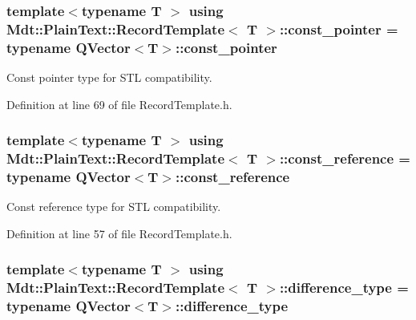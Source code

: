\subsubsection[{\texorpdfstring{const\+\_\+pointer}{const_pointer}}]{\setlength{\rightskip}{0pt plus 5cm}template$<$typename T $>$ using {\bf Mdt\+::\+Plain\+Text\+::\+Record\+Template}$<$ T $>$\+::{\bf const\+\_\+pointer} =  typename Q\+Vector$<$T$>$\+::{\bf const\+\_\+pointer}}\hypertarget{class_mdt_1_1_plain_text_1_1_record_template_a73aada75aed958eafa509e4e7161864c}{}\label{class_mdt_1_1_plain_text_1_1_record_template_a73aada75aed958eafa509e4e7161864c}


Const pointer type for S\+TL compatibility. 



Definition at line 69 of file Record\+Template.\+h.

\subsubsection[{\texorpdfstring{const\+\_\+reference}{const_reference}}]{\setlength{\rightskip}{0pt plus 5cm}template$<$typename T $>$ using {\bf Mdt\+::\+Plain\+Text\+::\+Record\+Template}$<$ T $>$\+::{\bf const\+\_\+reference} =  typename Q\+Vector$<$T$>$\+::{\bf const\+\_\+reference}}\hypertarget{class_mdt_1_1_plain_text_1_1_record_template_a0ffd0ced9230d5bf9ee0667187afe4d1}{}\label{class_mdt_1_1_plain_text_1_1_record_template_a0ffd0ced9230d5bf9ee0667187afe4d1}


Const reference type for S\+TL compatibility. 



Definition at line 57 of file Record\+Template.\+h.

\subsubsection[{\texorpdfstring{difference\+\_\+type}{difference_type}}]{\setlength{\rightskip}{0pt plus 5cm}template$<$typename T $>$ using {\bf Mdt\+::\+Plain\+Text\+::\+Record\+Template}$<$ T $>$\+::{\bf difference\+\_\+type} =  typename Q\+Vector$<$T$>$\+::{\bf difference\+\_\+type}}\hypertarget{class_mdt_1_1_plain_text_1_1_record_template_a28b5d1e32418df97716af8a89a22daad}{}\label{class_mdt_1_1_plain_text_1_1_record_template_a28b5d1e32418df97716af8a89a22daad}


